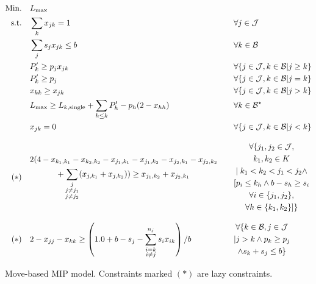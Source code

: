 \documentclass[oribibl]{llncs}
\def\Lmax{{L_{\mathrm{max}}}}
\begin{document}
\begin{model}
\begin{alignat}{2}
\mathrm{Min.}\quad & \Lmax && \\
\mathrm{s.t.}\quad & \label{mbm:eq7}\sum_{k} x_{jk} = 1 \quad && \forall j \in \mathcal{J} \\
& \label{mbm:eq6}\sum_{j} s_j x_{jk} \leq b \quad && \forall k \in \mathcal{B} \\
&\label{mbm:eq3} P'_k \geq p_j x_{jk} \quad && \forall \{j \in \mathcal{J}, k \in \mathcal{B} | j \geq k\} \\
&\label{mbm:eq10} P'_k \geq p_j \quad && \forall \{j \in \mathcal{J}, k \in \mathcal{B} | j = k\} \\
&\label{mbm:eq5} x_{kk} \geq x_{jk} \quad && \forall \{j \in \mathcal{J}, k \in \mathcal{B} | j > k\} \\
&\label{mbm:eq4} \Lmax \geq L_{k,\mathrm{single}} + \sum_{h\leq k} P'_h - p_h(2 -
x_{hh}) \quad && \forall k \in \mathcal{B}^\star \\
  \label{mbm:eq1} & x_{jk} = 0 \quad && \forall \{j \in \mathcal{J}, k \in \mathcal{B} | j < k\}
  \\[2ex]
  (*)\quad \label{mbm:eq8} & \begin{gathered} 2 (  4 - x_{k_1,k_1} - x_{k_2,k_2} - x_{j_1,k_1} - x_{j_1,k_2} -
x_{j_2,k_1} - x_{j_2,k_2}\hfill \\+ \sum_{\substack{{j}\\{j \neq j_1}\\{j \neq
j_2}}} (x_{j,k_1} + x_{j,k_2}) ) \geq x_{j_1,k_2} + x_{j_2,k_1} \end{gathered}
\quad && \begin{gathered} \forall\{ j_1, j_2 \in \mathcal{J}, \\ k_1, k_2 \in K \\|\; k_1 < k_2 <
j_1 < j_2 \land \\ [p_i \leq k_h \land b - s_h \geq s_i\\ \forall i \in
\{j_1,j_2\}, \\ \forall h
\in \{k_1,k_2\}] \} \end{gathered}
 \\[2ex]
(*)\quad &  \label{mbm:eq11}2 - x_{jj} - x_{kk} \geq \left(1.0 + b - s_j -
\sum_{\substack{{i = k}\\{i \neq j}}}^{n_j} s_i
x_{ik}\right) / b \quad && \begin{gathered} \forall \{k \in \mathcal{B}, j \in \mathcal{J} \\| j > k 
\land p_k \geq p_j \\ \land s_k + s_j \leq b\}\end{gathered}
\end{alignat}
\caption{Move-based MIP model. Constraints marked $(*)$ are lazy constraints.}
\label{mod:movebackmip}
\end{model}
\end{document}
